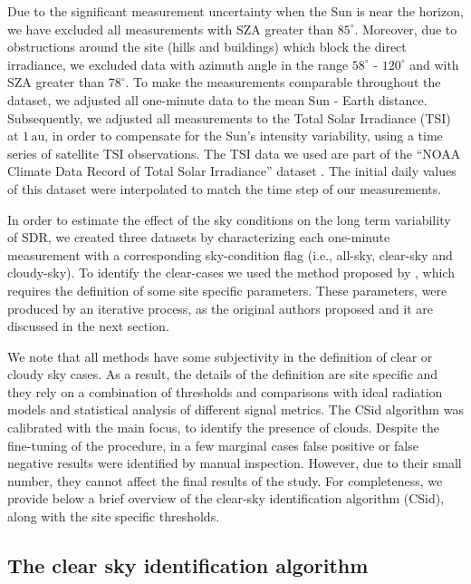 \documentclass[applsci,article,submit,moreauthors,pdftex]{Definitions/mdpi}
\begin{document}
Due to the significant measurement uncertainty when the Sun is near the
horizon, we have excluded all measurements with SZA greater than
\(85^\circ\). Moreover, due to obstructions around the site (hills and
buildings) which block the direct irradiance, we excluded data with
azimuth angle in the range \(58^{\circ}\) - \(120^{\circ}\) and with SZA
greater than \(78^{\circ}\). To make the measurements comparable
throughout the dataset, we adjusted all one-minute data to the mean Sun
- Earth distance. Subsequently, we adjusted all measurements to the
Total Solar Irradiance (TSI) at \(1\,\text{au}\), in order to compensate
for the Sun's intensity variability, using a time series of satellite
TSI observations. The TSI data we used are part of the ``NOAA Climate
Data Record of Total Solar Irradiance'' dataset \citep{Coddington2005}.
The initial daily values of this dataset were interpolated to match the
time step of our measurements.

In order to estimate the effect of the sky conditions on the long term
variability of SDR, we created three datasets by characterizing each
one-minute measurement with a corresponding sky-condition flag (i.e.,
all-sky, clear-sky and cloudy-sky). To identify the clear-cases we used
the method proposed by \citet{Reno2016}, which requires the definition
of some site specific parameters. These parameters, were produced by an
iterative process, as the original authors proposed and it are discussed
in the next section.

We note that all methods have some subjectivity in the definition of
clear or cloudy sky cases. As a result, the details of the definition
are site specific and they rely on a combination of thresholds and
comparisons with ideal radiation models and statistical analysis of
different signal metrics. The CSid algorithm was calibrated with the
main focus, to identify the presence of clouds. Despite the fine-tuning
of the procedure, in a few marginal cases false positive or false
negative results were identified by manual inspection. However, due to
their small number, they cannot affect the final results of the study.
For completeness, we provide below a brief overview of the clear-sky
identification algorithm (CSid), along with the site specific
thresholds.

\hypertarget{the-clear-sky-identification-algorithm}{%
\subsection{The clear sky identification
algorithm}\label{the-clear-sky-identification-algorithm}}
\end{document}
